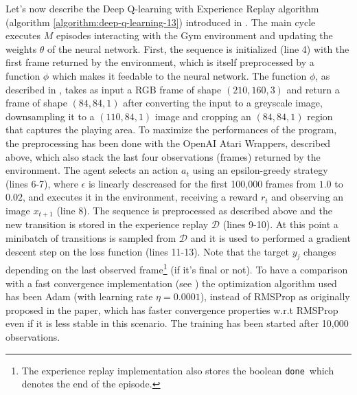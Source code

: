 \documentclass[a4paper]{article}
\numberwithin{equation}{section} %
\numberwithin{figure}{section} %
\numberwithin{table}{section} %
\theoremstyle{definition}
\begin{document}
Let's now describe the Deep Q-learning with Experience Replay algorithm
(algorithm \ref{algorithm:deep-q-learning-13}) introduced in \cite{mnih2013playing}.
The main cycle executes $M$ episodes interacting with the Gym environment and
updating the weights $\theta$ of the neural network. First, the sequence is
initialized (line 4) with the first frame returned by the environment, which
is itself preprocessed by a function $\phi$ which makes it feedable to the neural
network. The function $\phi$, as described in \cite{mnih2013playing}, takes as
input a RGB frame of shape $(210, 160, 3)$ and return a frame of shape
$(84, 84, 1)$ after converting the input to a greyscale image, downsampling it
to a $(110, 84, 1)$ image and cropping an $(84, 84, 1)$ region that captures
the playing area. To maximize the performances of the program, the preprocessing
has been done with the OpenAI Atari Wrappers\cite{openai-gym-baselines}, described
above, which also stack the last four observations (frames) returned by the environment.
The agent selects an action $a_t$ using an epsilon-greedy strategy (lines 6-7),
where $\epsilon$ is linearly descreased for the first 100,000 frames from $1.0$
to $0.02$, and executes it in the environment, receiving a reward $r_t$ and observing
an image $x_{t+1}$ (line 8). The sequence is preprocessed as described above and
the new transition is stored in the experience replay $\mathcal{D}$ (lines 9-10).
At this point a minibatch of transitions is sampled from $\mathcal{D}$ and it is
used to performed a gradient descent step on the loss function (lines 11-13).
Note that the target $y_j$ changes depending on the last observed
frame\footnote{The experience replay implementation also stores the boolean
\texttt{done}\ which denotes the end of the episode.} (if it's final or not).
To have a comparison with a fast convergence implementation (see \cite{Medium-Pong-30min})
the optimization algorithm used has been Adam (with learning rate $\eta = 0.0001$),
instead of RMSProp as originally proposed in the paper, which has faster
convergence properties w.r.t RMSProp\cite{Adam-Kingma} even if it is less stable
in this scenario. The training has been started after 10,000 observations.
\end{document}
